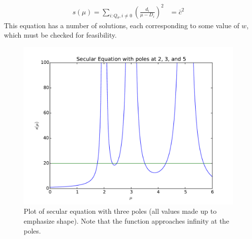 \documentclass[conference]{IEEEtran}
\begin{document}
\begin{align}\label{secular}
s(\mu) = \sum_{i:Q{_\theta,i}\neq 0} \left(\frac{d_i}{\mu - D_i}\right)^2 &= \bar{c}^2
\end{align}
This equation has a number of solutions, each corresponding to some value of $w$, which must be checked for feasibility.

\begin{figure}
\centering
\includegraphics[width=0.9\linewidth]{../images/secular}
\caption{Plot of secular equation with three poles (all values made up to emphasize shape). Note that the function approaches infinity at the poles.}
\label{fig:secular}
\end{figure}






%

%


\end{document}
